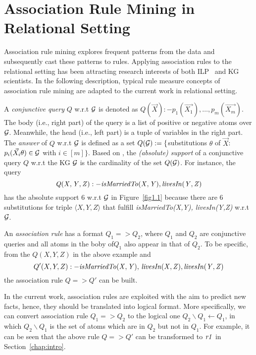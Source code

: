 \section{Association Rule Mining in Relational Setting}

Association rule mining explores frequent patterns from the data and subsequently cast these patterns to rules. Applying association rules to the relational setting has been attracting research interests of both ILP~\cite{ref52} and KG~\cite{ref10} scientists. In the following description, typical rule measure concepts of association rule mining are adapted to the current work in relational setting.

A \emph{conjunctive query} $Q$ w.r.t $\mathcal{G}$ is denoted as $Q(\vec{X}):-p_1(\vec{X_1}),\dotsc,p_m(\vec{X_m})$. The body (i.e., right part) of the query is a list of positive or negative atoms over $\mathcal{G}$. Meanwhile, the head (i.e., left part) is a tuple of variables in the right part. The \emph{answer} of $Q$ w.r.t $\mathcal{G}$ is defined as a set $Q(\mathcal{G}):=\{$substitutions $\theta$ of $\vec{X}$: $p_i(\vec{X_i}\theta) \in \mathcal{G}$ with $i \in [m]\}$. Based on \cite{ref53}, the \emph{(absolute) support} of a conjunctive query $Q$ w.r.t the KG $\mathcal{G}$ is the cardinality of the set $Q(\mathcal{G})$. For instance, the query
\begin{equation}\mathit{Q(X,Y,Z):-isMarriedTo(X,Y),\, }\mathit{livesIn(Y,Z)}
\end{equation}
has the absolute support $6$ w.r.t $\mathcal{G}$ in Figure~\ref{fig1.1} because there are $6$ substitutions for triple $\langle X, Y, Z \rangle$ that fulfill \textit{isMarriedTo(X,Y), livesIn(Y,Z)} w.r.t $\mathcal{G}$.

An \emph{association rule} has a format $Q_1 => Q_2$, where $Q_1$ and $Q_2$ are conjunctive queries and all atoms in the boby of$Q_1$ also appear in that of $Q_2$. To be specific, from the $Q(X,Y,Z)$ in the above example and
\begin{equation}Q'(X,Y,Z):-\mathit{isMarriedTo(X,Y),\,livesIn(X,Z),\,} \mathit{livesIn(Y,Z)}
\end{equation} the association rule $Q => Q'$ can be built.

In the current work, association rules are exploited with the aim to predict new facts, hence, they should be translated into logical format. More specifically, we can convert association rule $Q_1=>Q_2$ to the logical one $Q_2\backslash Q_1 \leftarrow Q_1$, in which $Q_2 \backslash Q_1$ is the set of atoms which are in $Q_2$ but not in $Q_1$. For example, it can be seen that the above rule $Q=>Q'$ can be transformed to $\mathit{r1}$ in Section~\ref{chap:intro}.

